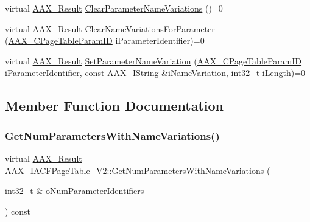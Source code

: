 \begin{DoxyCompactItemize}
\item 
virtual \mbox{\hyperlink{a00392_a4d8f69a697df7f70c3a8e9b8ee130d2f}{A\+A\+X\+\_\+\+Result}} \mbox{\hyperlink{a01729_ada210c1f77658103f2796ae3011bc603}{Clear\+Parameter\+Name\+Variations}} ()=0
\item 
virtual \mbox{\hyperlink{a00392_a4d8f69a697df7f70c3a8e9b8ee130d2f}{A\+A\+X\+\_\+\+Result}} \mbox{\hyperlink{a01729_af03ce323e3ad6bcfe3b11627698b43c7}{Clear\+Name\+Variations\+For\+Parameter}} (\mbox{\hyperlink{a00392_ab4e01b971dac1b25632fd9f710dd8f77}{A\+A\+X\+\_\+\+C\+Page\+Table\+Param\+ID}} i\+Parameter\+Identifier)=0
\item 
virtual \mbox{\hyperlink{a00392_a4d8f69a697df7f70c3a8e9b8ee130d2f}{A\+A\+X\+\_\+\+Result}} \mbox{\hyperlink{a01729_ac4e03c26b8423c49228d0011bf348e11}{Set\+Parameter\+Name\+Variation}} (\mbox{\hyperlink{a00392_ab4e01b971dac1b25632fd9f710dd8f77}{A\+A\+X\+\_\+\+C\+Page\+Table\+Param\+ID}} i\+Parameter\+Identifier, const \mbox{\hyperlink{a01873}{A\+A\+X\+\_\+\+I\+String}} \&i\+Name\+Variation, int32\+\_\+t i\+Length)=0
\end{DoxyCompactItemize}


\subsection{Member Function Documentation}
\mbox{\label{a01729_a325487a56b579e64a21dcfe1a2b435e9}} 
\subsubsection{\texorpdfstring{GetNumParametersWithNameVariations()}{GetNumParametersWithNameVariations()}}
{\footnotesize\ttfamily virtual \mbox{\hyperlink{a00392_a4d8f69a697df7f70c3a8e9b8ee130d2f}{A\+A\+X\+\_\+\+Result}} A\+A\+X\+\_\+\+I\+A\+C\+F\+Page\+Table\+\_\+\+V2\+::\+Get\+Num\+Parameters\+With\+Name\+Variations (\begin{DoxyParamCaption}\item[{int32\+\_\+t \&}]{o\+Num\+Parameter\+Identifiers }\end{DoxyParamCaption}) const\hspace{0.3cm}{\ttfamily [pure virtual]}}





